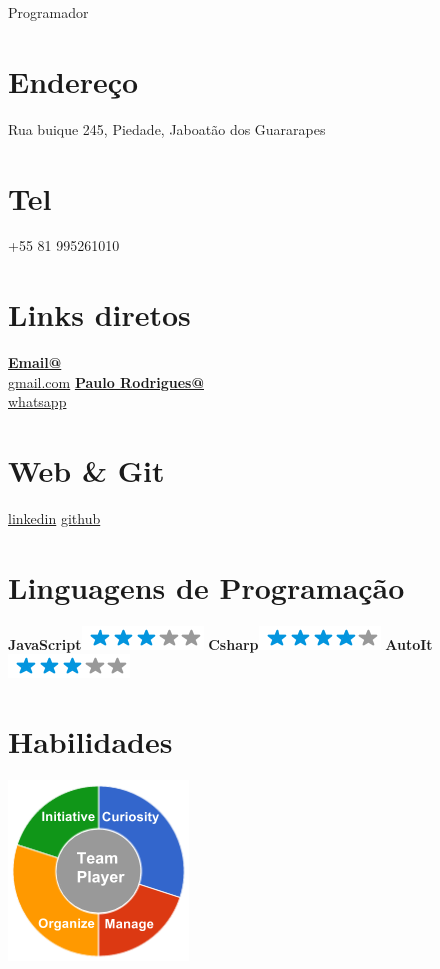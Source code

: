 \documentclass[]{friggeri-cv}
\begin{document}
      {Programador}
      

\begin{aside}
  \section{Endereço}
    Rua buique
    245, Piedade, Jaboatão dos Guararapes
    ~
  \section{Tel}
    +55 81 995261010
   ~
  \section{Links diretos}
    \href{mailto:pvrg.ava@gmail.com}{\textbf{Email@}\\gmail.com}
    \href{https://wa.me/5581995261010}{\textbf{Paulo Rodrigues@}\\whatsapp}
    ~
  \section{Web \& Git}
    \href{https://www.linkedin.com/in/paulorodrigues99/}{linkedin}
    \href{https://github.com/paulorodrigues99}{github}
    ~
  \section{Linguagens de Programação}
    \textbf{JavaScript}\includegraphics[scale=0.40]{img/3stars.png}
    \textbf{Csharp}\includegraphics[scale=0.40]{img/4stars.png}
    \textbf{AutoIt}\includegraphics[scale=0.40]{img/3stars.png}
    ~
  \section{Habilidades}
    \includegraphics[scale=0.62]{img/personal.png}
    ~

\end{aside}
\end{document}
